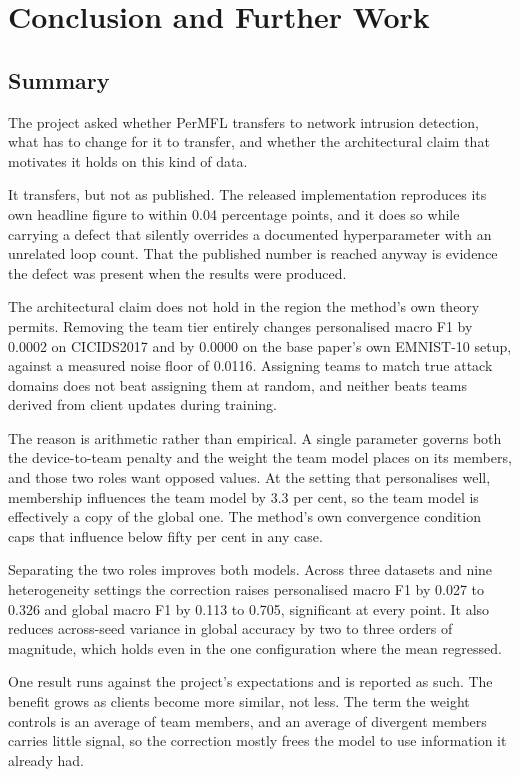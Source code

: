 \chapter{Conclusion and Further Work}
\label{chap:conclusion}

\section{Summary}
\label{sec:summary}

The project asked whether PerMFL transfers to network intrusion detection, what
has to change for it to transfer, and whether the architectural claim that
motivates it holds on this kind of data.

It transfers, but not as published. The released implementation reproduces its
own headline figure to within 0.04 percentage points, and it does so while
carrying a defect that silently overrides a documented hyperparameter with an
unrelated loop count. That the published number is reached anyway is evidence
the defect was present when the results were produced.

The architectural claim does not hold in the region the method's own theory
permits. Removing the team tier entirely changes personalised macro F1 by
0.0002 on CICIDS2017 and by 0.0000 on the base paper's own EMNIST-10 setup,
against a measured noise floor of 0.0116. Assigning teams to match true attack
domains does not beat assigning them at random, and neither beats teams derived
from client updates during training.

The reason is arithmetic rather than empirical. A single parameter governs both
the device-to-team penalty and the weight the team model places on its members,
and those two roles want opposed values. At the setting that personalises well,
membership influences the team model by 3.3 per cent, so the team model is
effectively a copy of the global one. The method's own convergence condition
caps that influence below fifty per cent in any case.

Separating the two roles improves both models. Across three datasets and nine
heterogeneity settings the correction raises personalised macro F1 by 0.027 to
0.326 and global macro F1 by 0.113 to 0.705, significant at every point. It also
reduces across-seed variance in global accuracy by two to three orders of
magnitude, which holds even in the one configuration where the mean regressed.

One result runs against the project's expectations and is reported as such. The
benefit grows as clients become more similar, not less. The term the weight
controls is an average of team members, and an average of divergent members
carries little signal, so the correction mostly frees the model to use
information it already had.

